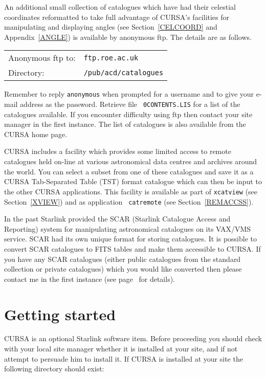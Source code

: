 \documentclass[twoside,11pt]{article}
\newcommand{\xlabel}[1]{}
\renewcommand{\_}{\texttt{\symbol{95}}}
\begin{document}
An additional small collection of catalogues which have had their celestial
coordinates reformatted to take full advantage of CURSA's facilities
for manipulating and displaying angles (see Section~\ref{CELCOORD} and
Appendix~\ref{ANGLE}) is available by anonymous ftp.  The details are
as follows.

\begin{tabular}{ll}
Anonymous ftp to: & {\tt ftp.roe.ac.uk}        \\
Directory:        & {\tt /pub/acd/catalogues}  \\
\end{tabular}

Remember to reply {\tt anonymous} when prompted for a username and
to give your e-mail address as the password.  Retrieve file {\tt
0CONTENTS.LIS} for a list of the catalogues available.  If you encounter
difficulty using ftp then contact your site manager in the first
instance.  The list of catalogues is also available from the CURSA home
page.

CURSA includes a facility which provides some limited access to remote
catalogues held on-line at various astronomical data centres and archives
around the world.  You can select a subset from one of these catalogues and
save it as a CURSA Tab-Separated Table (TST) format catalogue which can
then be input to the other CURSA applications. This facility is available
as part of {\tt xcatview} (see Section~\ref{XVIEW}) and as application {\tt
catremote} (see Section~\ref{REMACCSS}).
 
In the past Starlink provided the SCAR (Starlink Catalogue Access and
Reporting) system for manipulating astronomical catalogues on its
VAX/VMS service. SCAR had its own unique format for storing catalogues.
It is possible to convert SCAR catalogues to FITS tables and make them
accessible to CURSA. If you have any SCAR catalogues (either public
catalogues from the standard collection or private catalogues) which you
would like converted then please contact me in the first instance (see
page~\pageref{HOMEPAGE} for details).


\section{\xlabel{START}Getting started}

CURSA is an optional Starlink software item. Before proceeding you should 
check with your local site manager whether it is installed at your site,
and if not attempt to persuade him to install it.  If CURSA is installed at
your site the following directory should exist:
\end{document}

